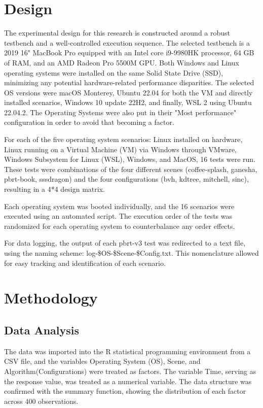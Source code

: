 \documentclass[conference]{IEEEtran}
\begin{document}
\section{Design}
The experimental design for this research is constructed around a robust testbench and a well-controlled execution sequence. The selected testbench is a 2019 16" MacBook Pro equipped with an Intel core i9-9980HK processor, 64 GB of RAM, and an AMD Radeon Pro 5500M GPU. Both Windows and Linux operating systems were installed on the same Solid State Drive (SSD), minimizing any potential hardware-related performance disparities. The selected OS versions were macOS Monterey, Ubuntu 22.04 for both the VM and directly installed scenarios, Windows 10 update 22H2, and finally, WSL 2 using Ubuntu 22.04.2. The Operating Systems were also put in their "Most performance" configuration in order to avoid that becoming a factor. 

For each of the five operating system scenarios: Linux installed on hardware, Linux running on a Virtual Machine (VM) via Windows through VMware, Windows Subsystem for Linux (WSL), Windows, and MacOS, 16 tests were run. These tests were combinations of the four different scenes (coffee-splash, ganesha, pbrt-book, sssdragon) and the four configurations (bvh, kdtree, mitchell, sinc), resulting in a 4*4 design matrix.

Each operating system was booted individually, and the 16 scenarios were executed using an automated script. The execution order of the tests was randomized for each operating system to counterbalance any order effects.

For data logging, the output of each pbrt-v3 test was redirected to a text file, using the naming scheme: log-\$OS-\$Scene-\$Config.txt. This nomenclature allowed for easy tracking and identification of each scenario.


\section{Methodology}
\subsection{Data Analysis}

The data was imported into the R statistical programming environment from a CSV file, and the variables Operating System (OS), Scene, and Algorithm(Configurations) were treated as factors. The variable Time, serving as the response value, was treated as a numerical variable. The data structure was confirmed with the summary function, showing the distribution of each factor across 400 observations.
\end{document}
